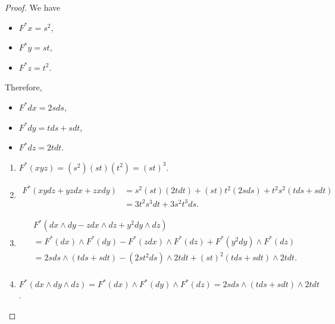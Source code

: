 \documentclass[12pt, psamsfonts]{amsart}
\theoremstyle{definition}
\theoremstyle{remark}
\numberwithin{equation}{section}
\begin{document}
\begin{proof}
  We have
  \begin{itemize}
    \item
      $F^*x = s^2$,
    \item
      $F^*y = st$,
    \item
      $F^*z = t^2$.
  \end{itemize}

  Therefore, 
  \begin{itemize}
    \item
      $F^*dx = 2sds$,
    \item
      $F^*dy = tds + sdt$,
    \item
      $F^*dz = 2tdt$.
  \end{itemize}

  \begin{enumerate}
    \item
      $F^*(xyz) = (s^2)(st)(t^2) = (st)^3$.
    \item
      \begin{align*}
        F^*(xydz + yzdx + zxdy)
          &= s^2(st)(2tdt) + (st)t^2(2sds) + t^2s^2(tds + sdt) \\
          &= 3t^2s^3dt + 3s^2t^3ds.
      \end{align*}
    \item
      \begin{align*}
        &F^*(dx \wedge dy - zdx \wedge dz + y^2dy \wedge dz) \\
          &= F^*(dx) \wedge F^*(dy) - F^*(zdx) \wedge F^*(dz) + F^*(y^2dy) \wedge F^*(dz) \\
          &= 2sds \wedge (tds + sdt) - (2st^2ds) \wedge 2tdt + (st)^2(tds + sdt) \wedge 2tdt. \\
      \end{align*}
    \item
      $F^*(dx \wedge dy \wedge dz) = F^*(dx) \wedge F^*(dy) \wedge F^*(dz) = 2sds \wedge (tds + sdt) \wedge 2tdt$.
  \end{enumerate}
\end{proof}
\end{document}
